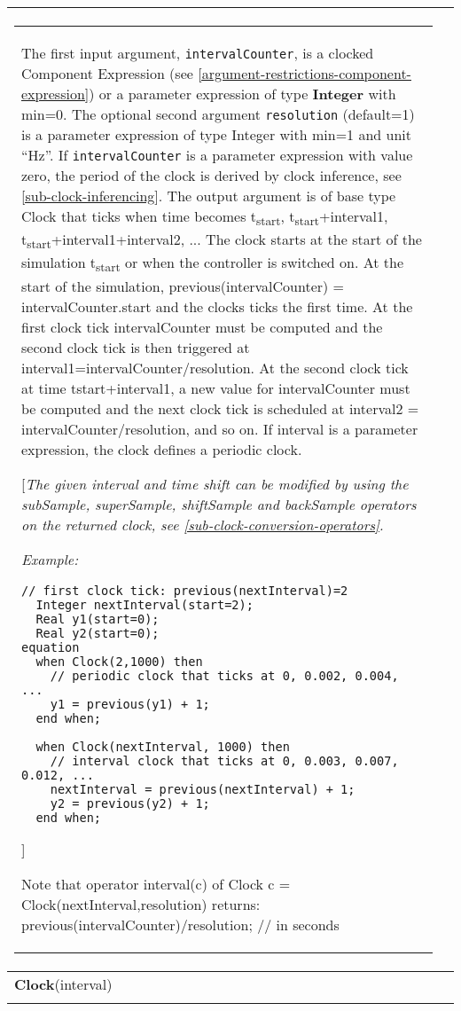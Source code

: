\begin{longtable}[]{|p{3cm}|p{12cm}|}
\begin{tabular}{@{}p{119mm}@{}}
The first input argument, \lstinline!intervalCounter!, is a clocked Component
Expression (see \autoref{argument-restrictions-component-expression}) or a parameter expression of type
\textbf{Integer} with min=0. The optional second argument \lstinline!resolution!
(default=1) is a parameter expression of type Integer with min=1 and
unit ``Hz''. If \lstinline!intervalCounter! is a parameter expression with value
zero, the period of the clock is derived by clock inference, see 
\autoref{sub-clock-inferencing}. The output argument is of base type Clock that ticks when time
becomes t\textsubscript{start}, t\textsubscript{start}+interval1,
t\textsubscript{start}+interval1+interval2, ... The clock starts at the
start of the simulation t\textsubscript{start} or when the controller is
switched on. At the start of the simulation, previous(intervalCounter) =
intervalCounter.start and the clocks ticks the first time. At the first
clock tick intervalCounter must be computed and the second clock tick is
then triggered at interval1=intervalCounter/resolution. At the second
clock tick at time tstart+interval1, a new value for intervalCounter
must be computed and the next clock tick is scheduled at interval2 =
intervalCounter/resolution, and so on. If interval is a parameter
expression, the clock defines a periodic clock.

{[}\emph{The given interval and time shift can be modified by using the
subSample, superSample, shiftSample and backSample operators on the
returned clock, see \autoref{sub-clock-conversion-operators}.}

\emph{Example:}
\begin{lstlisting}[language=modelica]
  // first clock tick: previous(nextInterval)=2    
  Integer nextInterval(start=2);    
  Real y1(start=0);    
  Real y2(start=0); 
equation   
  when Clock(2,1000) then      
    // periodic clock that ticks at 0, 0.002, 0.004, ...      
    y1 = previous(y1) + 1;   
  end when; 
 
  when Clock(nextInterval, 1000) then      
    // interval clock that ticks at 0, 0.003, 0.007, 0.012, ...     
    nextInterval = previous(nextInterval) + 1;     
    y2 = previous(y2) + 1;   
  end when; 
\end{lstlisting}
{]}

Note that operator interval(c) of Clock c =
Clock(nextInterval,resolution) returns:\newline
previous(intervalCounter)/resolution; // in seconds
\end{tabular}\\ \hline
\textbf{Clock}(interval)
&
\begin{tabular}{@{}p{119mm}@{}}
\textbf{Clock with Real Interval}\\


\end{tabular}
\end{longtable}
